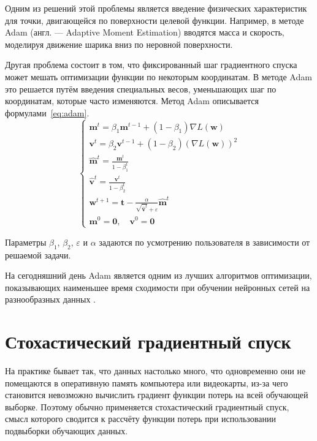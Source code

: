 Одним из решений этой проблемы является введение физических характеристик для точки, двигающейся по поверхности целевой функции. Например, в методе Adam (англ. --- Adaptive Moment Estimation) вводятся масса и скорость, моделируя движение шарика вниз по неровной поверхности.

Другая проблема состоит в том, что фиксированный шаг градиентного спуска может мешать оптимизации функции по некоторым координатам. В методе Adam это решается путём введения специальных весов, уменьшающих шаг по координатам, которые часто изменяются. Метод Adam описывается формулами \ref*{eq:adam}.
\begin{equation}
    \label{eq:adam}
    \begin{cases}
        \mathbf{m}^t=\beta_1\mathbf{m}^{t-1}+(1-\beta_1)\nabla L(\mathbf{w}) \\
        \mathbf{v}^t=\beta_2\mathbf{v}^{t-1}+(1-\beta_2)(\nabla L(\mathbf{w}))^2 \\
        \hat{\mathbf{m}}^t=\frac{\mathbf{m}^t}{1-\beta_1^t} \\
        \hat{\mathbf{v}}^t=\frac{\mathbf{v}^t}{1-\beta_2^t} \\
        \mathbf{w}^{t+1}=\mathbf{t}-\frac{\alpha}{\sqrt{\hat{\mathbf{v}}^t}+\varepsilon}\hat{\mathbf{m}}^t \\
        \mathbf{m}^0=\mathbf{0},\quad\mathbf{v}^0=\mathbf{0}
    \end{cases}
\end{equation}

Параметры $\beta_1$, $\beta_2$, $\varepsilon$ и $\alpha$ задаются по усмотрению пользователя в зависимости от решаемой задачи.

На сегодняшний день Adam является одним из лучших алгоритмов оптимизации, показывающих наименьшее время сходимости при обучении нейронных сетей на разнообразных данных \cite{art:optimizers}.

\section{Стохастический градиентный спуск}

На практике бывает так, что данных настолько много, что одновременно они не помещаются в оперативную память компьютера или видеокарты, из-за чего становится невозможно вычислить градиент функции потерь на всей обучающей выборке. Поэтому обычно применяется стохастический градиентный спуск, смысл которого сводится к рассчёту функции потерь при использовании подвыборки обучающих данных.

